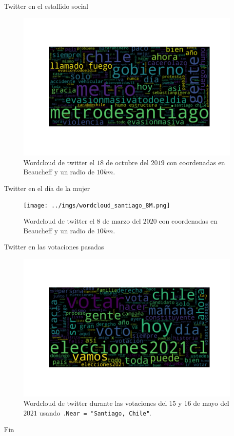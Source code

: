 \documentclass{beamer}
\begin{document}
	\begin{frame}{Twitter en el estallido social}
		\begin{figure}[h]
			\centering
			\includegraphics[scale=.5]{../imgs/wordcloud_santiago_estallido1.png}
			\caption{Wordcloud de twitter el $18$ de octubre del $2019$ con coordenadas en Beaucheff y un radio de $10km$.}
		\end{figure}
	\end{frame}

	\begin{frame}{Twitter en el día de la mujer}
		\begin{figure}[h]
			\centering
			\texttt{[image: ../imgs/wordcloud\_santiago\_8M.png]}
			\caption{Wordcloud de twitter el $8$ de marzo del $2020$ con coordenadas en Beaucheff y un radio de $10km$.}
		\end{figure}
	\end{frame}

	\begin{frame}{Twitter en las votaciones pasadas}
		\begin{figure}[h]
			\centering
			\includegraphics[scale=.5]{../imgs/wordcloud_chile_votaciones.png}
			\caption{Wordcloud de twitter durante las votaciones del $15$ y $16$ de mayo del $2021$ usando \texttt{.Near = "Santiago, Chile"}.}
		\end{figure}
	\end{frame}

	\begin{frame}{Fin}
		\centering
	\end{frame}

	
	
	
\end{document}
